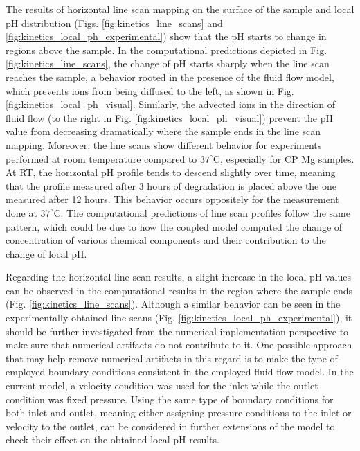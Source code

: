 The results of horizontal line scan mapping on the surface of the sample and local pH distribution (Figs. \ref{fig:kinetics_line_scans} and \ref{fig:kinetics_local_ph_experimental}) show that the pH starts to change in regions above the sample. In the computational predictions depicted in Fig. \ref{fig:kinetics_line_scans}, the change of pH starts sharply when the line scan reaches the sample, a behavior rooted in the presence of the fluid flow model, which prevents ions from being diffused to the left, as shown in Fig. \ref{fig:kinetics_local_ph_visual}. Similarly, the advected ions in the direction of fluid flow (to the right in Fig. \ref{fig:kinetics_local_ph_visual}) prevent the pH value from decreasing dramatically where the sample ends in the line scan mapping. Moreover, the line scans show different behavior for experiments performed at room temperature compared to $37^{\circ}\text{C}$, especially for {CP} Mg samples. At {RT}, the horizontal pH profile tends to descend slightly over time, meaning that the profile measured after 3 hours of degradation is placed above the one measured after 12 hours. This behavior occurs oppositely for the measurement done at $37^{\circ}\text{C}$. The computational predictions of line scan profiles follow the same pattern, which could be due to how the coupled model computed the change of concentration of various chemical components and their contribution to the change of local pH.

Regarding the horizontal line scan results, a slight increase in the local pH values can be observed in the computational results in the region where the sample ends (Fig. \ref{fig:kinetics_line_scans}). Although a similar behavior can be seen in the experimentally-obtained line scans (Fig. \ref{fig:kinetics_local_ph_experimental}), it should be further investigated from the numerical implementation perspective to make sure that numerical artifacts do not contribute to it. One possible approach that may help remove numerical artifacts in this regard is to make the type of employed boundary conditions consistent in the employed fluid flow model. In the current model, a velocity condition was used for the inlet while the outlet condition was fixed pressure. Using the same type of boundary conditions for both inlet and outlet, meaning either assigning pressure conditions to the inlet or velocity to the outlet, can be considered in further extensions of the model to check their effect on the obtained local pH results.

